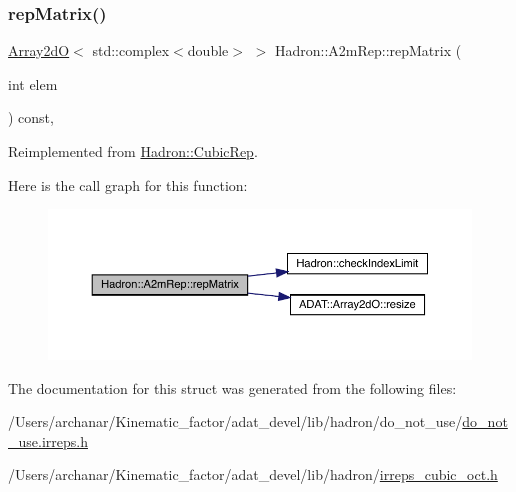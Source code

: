 \subsubsection{\texorpdfstring{repMatrix()}{repMatrix()}\hspace{0.1cm}{\footnotesize\ttfamily [2/2]}}
{\footnotesize\ttfamily \mbox{\hyperlink{classADAT_1_1Array2dO}{Array2dO}}$<$ std\+::complex$<$double$>$ $>$ Hadron\+::\+A2m\+Rep\+::rep\+Matrix (\begin{DoxyParamCaption}\item[{int}]{elem }\end{DoxyParamCaption}) const\hspace{0.3cm}{\ttfamily [inline]}, {\ttfamily [virtual]}}



Reimplemented from \mbox{\hyperlink{structHadron_1_1CubicRep_ac5d7e9e6f4ab1158b5fce3e4ad9e8005}{Hadron\+::\+Cubic\+Rep}}.

Here is the call graph for this function\+:
\nopagebreak
\begin{figure}[H]
\begin{center}
\leavevmode
\includegraphics[width=350pt]{da/db3/structHadron_1_1A2mRep_a02575a23902366eafe355b1c36667754_cgraph}
\end{center}
\end{figure}


The documentation for this struct was generated from the following files\+:\begin{DoxyCompactItemize}
\item 
/\+Users/archanar/\+Kinematic\+\_\+factor/adat\+\_\+devel/lib/hadron/do\+\_\+not\+\_\+use/\mbox{\hyperlink{do__not__use_8irreps_8h}{do\+\_\+not\+\_\+use.\+irreps.\+h}}\item 
/\+Users/archanar/\+Kinematic\+\_\+factor/adat\+\_\+devel/lib/hadron/\mbox{\hyperlink{lib_2hadron_2irreps__cubic__oct_8h}{irreps\+\_\+cubic\+\_\+oct.\+h}}\end{DoxyCompactItemize}
